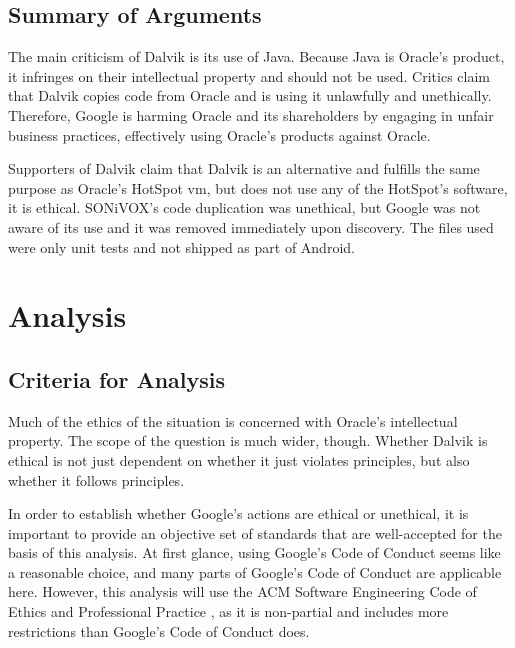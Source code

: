 \documentclass[11pt]{article}
\begin{document}
\begin{multicols}{2}

\subsection{Summary of Arguments} %
\label{sub:args-summary}

The main criticism of Dalvik is its use of Java.  Because Java is Oracle's
product, it infringes on their intellectual property and should not be used.
Critics claim that Dalvik copies code from Oracle and is using it unlawfully and
unethically.  Therefore, Google is harming Oracle and its shareholders by
engaging in unfair business practices, effectively using Oracle's products
against Oracle.

Supporters of Dalvik claim that Dalvik is an alternative and fulfills the same
purpose as Oracle's HotSpot \gls{vm}, but does not use any of the HotSpot's
software, it is ethical.  SONiVOX's code duplication was unethical, but Google
was not aware of its use and it was removed immediately upon discovery.  The
files used were only unit tests and not shipped as part of Android.



\section{Analysis} %
\label{sec:analysis}

\subsection{Criteria for Analysis} %
\label{sub:criteria}

Much of the ethics of the situation is concerned with Oracle's intellectual
property.  The scope of the question is much wider, though.  Whether Dalvik is
ethical is not just dependent on whether it just violates principles, but also
whether it follows principles.

In order to establish whether Google's actions are ethical or unethical, it is
important to provide an objective set of standards that are well-accepted for
the basis of this analysis.  At first glance, using Google's Code of Conduct
\cite{google-conduct} seems like a reasonable choice, and many parts of Google's
Code of Conduct are applicable here.  However, this analysis will use the ACM
Software Engineering Code of Ethics and Professional Practice \cite{secode}, as
it is non-partial and includes more restrictions than Google's Code of Conduct
does.


\end{multicols}
\end{document}
